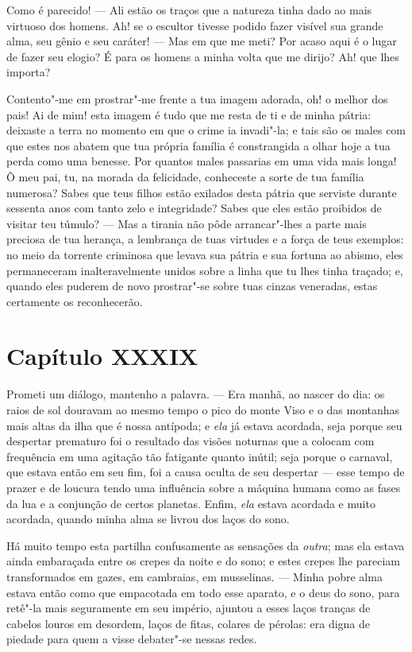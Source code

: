  Como é parecido! --- Ali estão os traços que a natureza tinha dado ao
mais virtuoso dos homens. Ah! se o escultor tivesse podido fazer
visível sua grande alma, seu gênio e seu caráter! --- Mas em que me
meti? Por acaso aqui é o lugar de fazer seu elogio? É para os homens a
minha volta que me dirijo? Ah! que lhes importa? 

 Contento"-me em prostrar"-me frente a tua imagem adorada, oh! o melhor
dos pais! Ai de mim! esta imagem é tudo que me resta de ti e de minha
pátria: deixaste a terra no momento em que o crime ia invadi"-la; e tais
são os males com que estes nos abatem que tua própria família é
constrangida a olhar hoje a tua perda como uma benesse. Por quantos
males passarias em uma vida mais longa! Ô meu pai, tu, na morada
da felicidade, conheceste a sorte de tua família numerosa? Sabes que teus
filhos estão exilados desta pátria que serviste durante sessenta anos
com tanto zelo e integridade? Sabes que eles estão proibidos de visitar
teu túmulo? --- Mas a tirania não pôde arrancar"-lhes a parte mais
preciosa de tua herança, a lembrança de tuas virtudes e a força de teus
exemplos: no meio da torrente criminosa que levava sua pátria e sua
fortuna ao abismo, eles permaneceram inalteravelmente unidos sobre a
linha que tu lhes tinha traçado; e, quando eles puderem de novo
prostrar"-se sobre tuas cinzas veneradas, estas certamente os
reconhecerão. 

\section*{Capítulo XXXIX}

 Prometi um diálogo, mantenho a palavra. --- Era manhã, ao nascer do
dia: os raios de sol douravam ao mesmo tempo o pico do monte Viso e o
das montanhas mais altas da ilha que é nossa antípoda; e \textit{ela}
já estava acordada, seja porque seu despertar prematuro foi o resultado
das visões noturnas que a colocam com frequência em uma agitação tão
fatigante quanto inútil; seja porque o carnaval, que estava então em
seu fim, foi a causa oculta de seu despertar --- esse tempo de prazer e
de loucura tendo uma influência sobre a máquina humana como as fases da
lua e a conjunção de certos planetas. Enfim, \textit{ela} estava
acordada e muito acordada, quando minha alma se livrou dos laços do
sono. 

 Há muito tempo esta partilha confusamente as sensações da
\textit{outra}; mas ela estava ainda embaraçada entre os crepes da
noite e do sono; e estes crepes lhe pareciam transformados em gazes, em
cambraias, em musselinas. --- Minha pobre alma estava então como que
empacotada em todo esse aparato, e o deus do sono, para retê"-la mais
seguramente em seu império, ajuntou a esses laços tranças de cabelos
louros em desordem, laços de fitas, colares de pérolas: era digna de
piedade para quem a visse debater"-se nessas redes. 

